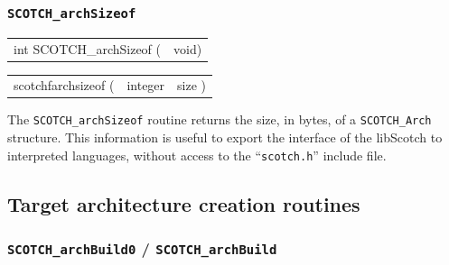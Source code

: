 \subsubsection{{\tt SCOTCH\_archSizeof}}

\begin{itemize}
\progsyn

{\tt\begin{tabular}{l@{}l}
int SCOTCH\_archSizeof ( & void)
\end{tabular}}

{\tt\begin{tabular}{l@{}ll}
scotchfarchsizeof ( & integer & size )
\end{tabular}}

\progdes

The {\tt SCOTCH\_archSizeof} routine returns the size, in bytes, of a
{\tt SCOTCH\_\lbt Arch} structure. This information is useful to
export the interface of the {\sc libScotch} to interpreted languages,
without access to the ``{\tt scotch.h}'' include file.
\end{itemize}

\subsection{Target architecture creation routines}
\label{sec-lib-arch-create}

\subsubsection{{\tt SCOTCH\_archBuild0} / {\tt SCOTCH\_archBuild}}
\label{sec-lib-arch-build}

